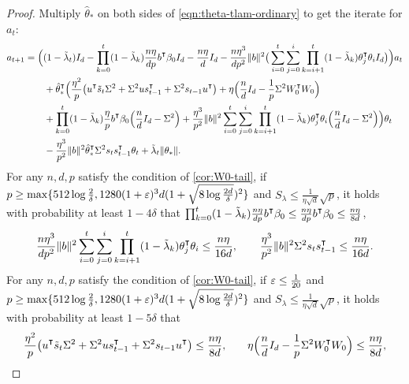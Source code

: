 \begin{proof}
    Multiply $\hat\theta_\ast$ on both sides of \cref{eqn:theta-tlam-ordinary} to get the iterate for $a_t$:
    \begin{align}\label{eqn:a_tlam-ordinary}
        \begin{split}
            a_{t+1} & = \Big((1-\tlam_t)I_d -\prod_{k=0}^t(1-\tlam_k)\frac{n\eta}{dp}b\transpose\beta_0 I_d -\frac{n\eta}{d} I_d - \frac{n\eta^3}{dp^2}\|b\|^2\big(\sum_{i=0}^t\sum_{j=0}^i\prod_{k=i+1}^t(1-\tlam_k)\theta_j\transpose \theta_i I_d \big)\Big) a_t \\
            & \qquad + \hat\theta_\ast\transpose\Big( \frac{\eta^2}{p}\big(u\transpose \tilde{s}_t \Sigma^2 + \Sigma^2 u s_{t-1}\transpose + \Sigma^2 s_{t-1}u\transpose\big) + \eta\Big(\frac{n}{d}I_d - \frac{1}{p}\Sigma^2 W_0\transpose W_0\Big) \\
            & \qquad + \prod_{k=0}^t (1-\tilde\lambda_k)\frac{\eta}{p}b\transpose\beta_0 \Big(\frac{n}{d}I_d - \Sigma^2\Big) + \frac{\eta^3}{p^2}\|b\|^2\sum_{i=0}^t\sum_{j=0}^i\prod_{k=i+1}^t(1-\tilde\lambda_k)\theta_j\transpose \theta_i \Big(\frac{n}{d}I_d-\Sigma^2\Big) \Big)\theta_t \\
            & \qquad -\frac{\eta^3}{p^2}\|b\|^2 \hat\theta_\ast\transpose \Sigma^2 s_{t}s_{t-1}\transpose \theta_t + \tlam_t\|\theta_*\|.
        \end{split}
    \end{align}
    For any $n,d,p$ satisfy the condition of \cref{cor:W0-tail}, if $p\geq \max\{512\log\frac{2}{\delta},1280(1+\varepsilon)^3d(1+\sqrt{8\log\frac{2d}{\delta}})^2\}$ and $S_\lambda\leq \frac{1}{\eta\sqrt{d}}\sqrt{p}$, it holds with probability at least $1-4\delta$ that $\prod_{k=0}^t (1-\tlam_k)\frac{n\eta}{dp} b\transpose\beta_0 \leq \frac{n\eta}{dp}b\transpose\beta_0 \leq \frac{n\eta}{8d}$,
    \begin{align*}
        \frac{n\eta^3}{dp^2}\|b\|^2 \sum_{i=0}^t\sum_{j=0}^i\prod_{k=i+1}^t(1-\tlam_k)\theta_j\transpose \theta_i \leq \frac{n\eta}{16d}, \qquad
        \frac{\eta^3}{p^2}\|b\|^2 \Sigma^2 s_{t}s_{t-1}\transpose \leq \frac{n\eta}{16d}.
    \end{align*}
    For any $n,d,p$ satisfy the condition of \cref{cor:W0-tail}, if $\varepsilon\leq \frac{1}{20}$ and $p\geq \max\{512\log\frac{2}{\delta},1280(1+\varepsilon)^3d(1+\sqrt{8\log\frac{2d}{\delta}})^2\}$ and $S_\lambda\leq \frac{1}{\eta\sqrt{d}}\sqrt{p}$, it holds with probability at least $1-5\delta$ that
    \begin{align*}
        \frac{\eta^2}{p}\big(u\transpose \tilde{s}_t \Sigma^2 + \Sigma^2 u s_{t-1}\transpose + \Sigma^2 s_{t-1}u\transpose\big) \leq \frac{n\eta}{8d},& \qquad \eta\Big(\frac{n}{d}I_d - \frac{1}{p}\Sigma^2 W_0\transpose W_0\Big) \leq \frac{n\eta}{8d}, \\

\end{align*}
\end{proof}
